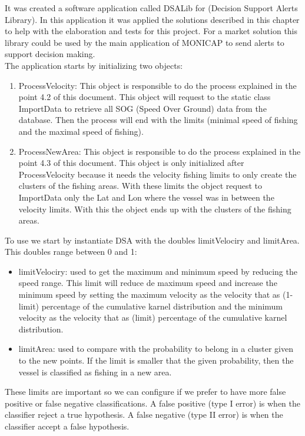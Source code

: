 It was created a software application called DSALib for (Decision Support Alerts Library). In this application it was applied the solutions described in this chapter to help with the elaboration and tests for this project. For a market solution this library could be used by the main application of MONICAP to send alerts to support decision making.
\\
The application starts by initializing two objects:
\begin{enumerate}
\item	ProcessVelocity: This object is responsible to do the process explained in the point 4.2 of this document. This object will request to the static class ImportData to retrieve all SOG (Speed Over Ground) data from the database. Then the process will end with the limits (minimal speed of fishing and the maximal speed of fishing).
\item	ProcessNewArea: This object is responsible to do the process explained in the point 4.3 of this document. This object is only initialized after ProcessVelocity because it needs the velocity fishing limits to only create the clusters of the fishing areas. With these limits the object request to ImportData only the Lat and Lon where the vessel was in between the velocity limits. With this the object ends up with the clusters of the fishing areas.
\end{enumerate}
To use we start by instantiate DSA with the doubles limitVelociry and limitArea. This doubles range between 0 and 1:
\begin{itemize}
\item	limitVelociry: used to get the maximum and minimum speed by reducing the speed range. This limit will reduce de maximum speed and increase the minimum speed by setting the maximum velocity as the velocity that as (1-limit) percentage of the cumulative karnel distribution and the minimum velocity as the velocity that as (limit) percentage of the cumulative karnel distribution.
\item	limitArea: used to compare with the probability to belong in a cluster given to the new points. If the limit is smaller that the given probability, then the vessel is classified as fishing in a new area.
\end{itemize}
These limits are important so we can configure if we prefer to have more false positive or false negative classifications.
A false positive (type I error) is when the classifier reject a true hypothesis.
A false negative (type II error) is when the classifier accept a false hypothesis.

